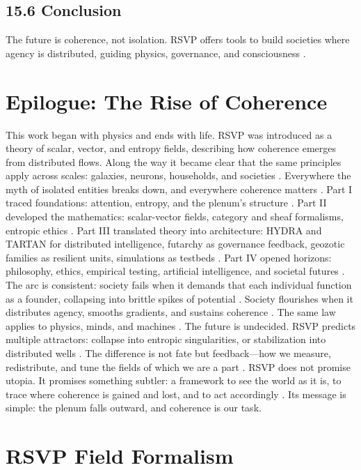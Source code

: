 \documentclass[12pt]{article}
\begin{document}
\subsection*{15.6 Conclusion}
The future is coherence, not isolation. RSVP offers tools to build societies where agency is distributed, guiding physics, governance, and consciousness \citep{whitehead1978}.
\section*{Epilogue: The Rise of Coherence}
This work began with physics and ends with life. RSVP was introduced as a theory of scalar, vector, and entropy fields, describing how coherence emerges from distributed flows. Along the way it became clear that the same principles apply across scales: galaxies, neurons, households, and societies \citep{gromov1999}. Everywhere the myth of isolated entities breaks down, and everywhere coherence matters \citep{whitehead1978}.
Part I traced foundations: attention, entropy, and the plenum's structure \citep{zuboff2019, shannon1948}. Part II developed the mathematics: scalar-vector fields, category and sheaf formalisms, entropic ethics \citep{maclane1998, lawvere2009}. Part III translated theory into architecture: HYDRA and TARTAN for distributed intelligence, futarchy as governance feedback, geozotic families as resilient units, simulations as testbeds \citep{bird1988, hanson2003}. Part IV opened horizons: philosophy, ethics, empirical testing, artificial intelligence, and societal futures \citep{ortega1957, tononi2004}.
The arc is consistent: society fails when it demands that each individual function as a founder, collapsing into brittle spikes of potential \citep{zuboff2019}. Society flourishes when it distributes agency, smooths gradients, and sustains coherence \citep{deleuze1987}. The same law applies to physics, minds, and machines \citep{baez2011}.
The future is undecided. RSVP predicts multiple attractors: collapse into entropic singularities, or stabilization into distributed wells \citep{hatcher2002}. The difference is not fate but feedback---how we measure, redistribute, and tune the fields of which we are a part \citep{hanson2003}. RSVP does not promise utopia. It promises something subtler: a framework to see the world as it is, to trace where coherence is gained and lost, and to act accordingly \citep{whitehead1978}. Its message is simple: the plenum falls outward, and coherence is our task.

\appendix
\section*{RSVP Field Formalism}
\end{document}
